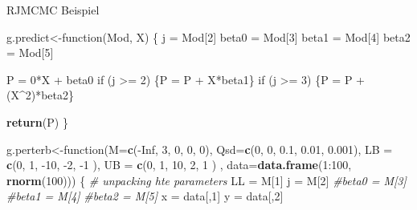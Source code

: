 \documentclass[ignorenonframetext,]{beamer}
\newenvironment{Shaded}{\begin{snugshade}}{\end{snugshade}}
\newcommand{\KeywordTok}[1]{\textcolor[rgb]{0.13,0.29,0.53}{\textbf{{#1}}}}
\newcommand{\DataTypeTok}[1]{\textcolor[rgb]{0.13,0.29,0.53}{{#1}}}
\newcommand{\DecValTok}[1]{\textcolor[rgb]{0.00,0.00,0.81}{{#1}}}
\newcommand{\FloatTok}[1]{\textcolor[rgb]{0.00,0.00,0.81}{{#1}}}
\newcommand{\StringTok}[1]{\textcolor[rgb]{0.31,0.60,0.02}{{#1}}}
\newcommand{\CommentTok}[1]{\textcolor[rgb]{0.56,0.35,0.01}{\textit{{#1}}}}
\newcommand{\OtherTok}[1]{\textcolor[rgb]{0.56,0.35,0.01}{{#1}}}
\newcommand{\NormalTok}[1]{{#1}}
\begin{document}
\begin{frame}{RJMCMC Beispiel}

\begin{Shaded}
\begin{Highlighting}[]
\NormalTok{g.predict<-function(Mod, X)}
\NormalTok{\{}
\NormalTok{j     =}\StringTok{ }\NormalTok{Mod[}\DecValTok{2}\NormalTok{]}
\NormalTok{beta0 =}\StringTok{ }\NormalTok{Mod[}\DecValTok{3}\NormalTok{]}
\NormalTok{beta1 =}\StringTok{ }\NormalTok{Mod[}\DecValTok{4}\NormalTok{]}
\NormalTok{beta2 =}\StringTok{ }\NormalTok{Mod[}\DecValTok{5}\NormalTok{]}

\NormalTok{P =}\StringTok{ }\DecValTok{0}\NormalTok{*X +}\StringTok{ }\NormalTok{beta0}
\NormalTok{if (j >=}\StringTok{ }\DecValTok{2}\NormalTok{) \{P =}\StringTok{ }\NormalTok{P +}\StringTok{ }\NormalTok{X*beta1\}}
\NormalTok{if (j >=}\StringTok{ }\DecValTok{3}\NormalTok{) \{P =}\StringTok{ }\NormalTok{P +}\StringTok{ }\NormalTok{(X^}\DecValTok{2}\NormalTok{)*beta2\}}

\KeywordTok{return}\NormalTok{(P)}
\NormalTok{\}}
\end{Highlighting}
\end{Shaded}

\begin{Shaded}
\begin{Highlighting}[]
\NormalTok{g.perterb<-function(}\DataTypeTok{M=}\KeywordTok{c}\NormalTok{(-}\OtherTok{Inf}\NormalTok{, }\DecValTok{3}\NormalTok{, }\DecValTok{0}\NormalTok{, }\DecValTok{0}\NormalTok{, }\DecValTok{0}\NormalTok{), }\DataTypeTok{Qsd=}\KeywordTok{c}\NormalTok{(}\DecValTok{0}\NormalTok{, }\DecValTok{0}\NormalTok{, }\FloatTok{0.1}\NormalTok{, }\FloatTok{0.01}\NormalTok{, }\FloatTok{0.001}\NormalTok{), }\DataTypeTok{LB =} \KeywordTok{c}\NormalTok{(}\DecValTok{0}\NormalTok{, }\DecValTok{1}\NormalTok{, -}\DecValTok{10}\NormalTok{, -}\DecValTok{2}\NormalTok{, -}\DecValTok{1} \NormalTok{), }\DataTypeTok{UB =} \KeywordTok{c}\NormalTok{(}\DecValTok{0}\NormalTok{, }\DecValTok{1}\NormalTok{, }\DecValTok{10}\NormalTok{, }\DecValTok{2}\NormalTok{, }\DecValTok{1} \NormalTok{)  , }\DataTypeTok{data=}\KeywordTok{data.frame}\NormalTok{(}\DecValTok{1}\NormalTok{:}\DecValTok{100}\NormalTok{, }\KeywordTok{rnorm}\NormalTok{(}\DecValTok{100}\NormalTok{)))}
\NormalTok{\{}
\CommentTok{# unpacking hte parameters}
\NormalTok{LL    =}\StringTok{ }\NormalTok{M[}\DecValTok{1}\NormalTok{]}
\NormalTok{j     =}\StringTok{ }\NormalTok{M[}\DecValTok{2}\NormalTok{]}
\CommentTok{#beta0 = M[3]}
\CommentTok{#beta1 = M[4]}
\CommentTok{#beta2 = M[5]}
\NormalTok{x     =}\StringTok{ }\NormalTok{data[,}\DecValTok{1}\NormalTok{]}
\NormalTok{y     =}\StringTok{ }\NormalTok{data[,}\DecValTok{2}\NormalTok{]}


\end{Highlighting}
\end{Shaded}
\end{frame}
\end{document}
